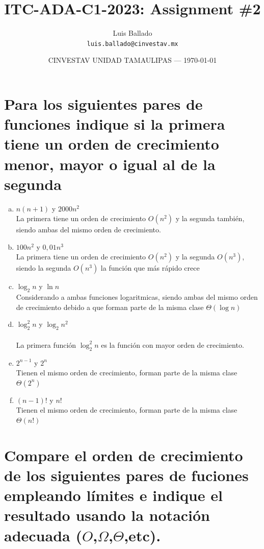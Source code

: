 \documentclass{article}
\title{ITC-ADA-C1-2023: Assignment \#2} %
\author{Luis Ballado\\ \texttt{luis.ballado@cinvestav.mx}} %
\date{CINVESTAV UNIDAD TAMAULIPAS --- \today} %
\begin{document}
\maketitle %


\section{Para los siguientes pares de funciones indique si la primera tiene un orden de crecimiento menor, mayor o igual al de la segunda}

\begin{enumerate}[(a)]
\item $n(n+1)$ y $2000n^{2}$\\
  La primera tiene un orden de crecimiento \textbf{$O(n^2)$} y la segunda también, siendo ambas del mismo orden de crecimiento.
\item $100n^{2}$ y $0,01n^{3}$\\
  La primera tiene un orden de crecimiento \textbf{$O(n^2)$} y la segunda \textbf{$O(n^3)$}, siendo la segunda $O(n^3)$ la función que más rápido crece
\item $\log_{2}n$ y $\ln n$\\
  Considerando a ambas funciones logaritmicas, siendo ambas del mismo orden de crecimiento debido a que forman parte de la misma clase $\Theta(\log n)$
\item $\log_{2}^{2} n$ y $\log_{2}n^{2}$\\\\
  La primera función $\log_{2}^{2} n$ es la función con mayor orden de crecimiento.
\item $2^{n-1}$ y $2^{n}$ \\
  Tienen el mismo orden de crecimiento, forman parte de la misma clase $\Theta(2^{n})$
\item $(n-1)!$ y $n!$ \\
  Tienen el mismo orden de crecimiento, forman parte de la misma clase $\Theta(n!)$
\end{enumerate}

\section{Compare el orden de crecimiento de los siguientes pares de fuciones empleando límites e indique el resultado usando la notación adecuada ($O$,$\Omega$,$\Theta$,etc).}
\end{document}

